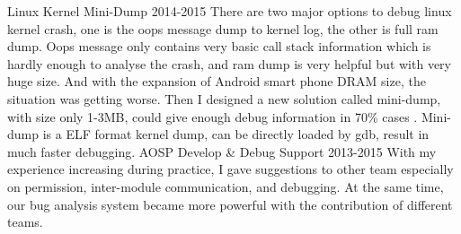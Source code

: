 \begin{cventries}
{\begin{cvsubentries}
          {}
          {Linux Kernel Mini-Dump}
          {2014-2015}
          {There are two major options to debug linux kernel crash, one is the oops message dump to kernel log, the other is full ram dump. Oops message only contains very basic call stack information which is hardly enough to analyse the crash, and ram dump is very helpful but with very huge size. And with the expansion of Android smart phone DRAM size, the situation was getting worse. Then I designed a new solution called mini-dump, with size only 1-3MB, could give enough debug information in 70\% cases . Mini-dump is a ELF format kernel dump, can be directly loaded by gdb, result in much faster debugging.}
        \cvsubentry
          {}
          {AOSP Develop \& Debug Support}
          {2013-2015}
          {With my experience increasing during practice, I gave suggestions to other team especially on permission, inter-module communication, and debugging. At the same time, our bug analysis system became more powerful with the contribution of different teams.}
      \end{cvsubentries}
    }

\end{cventries}
